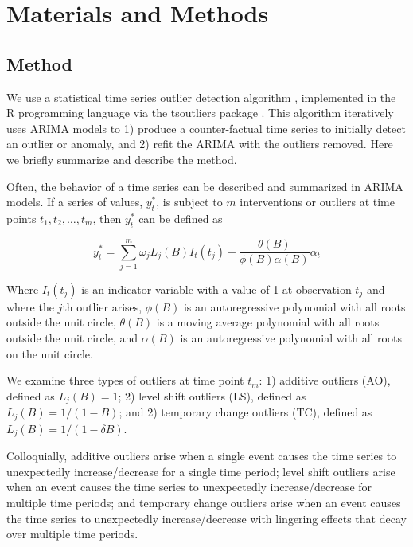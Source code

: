 \documentclass[12pt]{article}
\begin{document}
\hypertarget{materials-and-methods}{%
\section{Materials and Methods}\label{materials-and-methods}}

\hypertarget{method}{%
\subsection{Method}\label{method}}

We use a statistical time series outlier detection algorithm
\citep{chen1993joint}, implemented in the R programming language
\citep{rcore} via the tsoutliers package \citep{tsoutliers2019}. This
algorithm iteratively uses ARIMA models to 1) produce a counter-factual
time series to initially detect an outlier or anomaly, and 2) refit the
ARIMA with the outliers removed. Here we briefly summarize and describe
the method.

Often, the behavior of a time series can be described and summarized in
ARIMA models. If a series of values, \(y_t^*\), is subject to \(m\)
interventions or outliers at time points \(t_1,t_2,…,t_m\), then
\(y_t^*\) can be defined as

\[y_t^* = \sum_{j=1}^{m} \omega_jL_j(B)I_t(t_j) + \frac{\theta(B)}{\phi(B)\alpha(B)}\alpha_t\]

Where \(I_t(t_j)\) is an indicator variable with a value of 1 at
observation \(t_j\) and where the \(j\)th outlier arises, \(\phi(B)\) is
an autoregressive polynomial with all roots outside the unit circle,
\(\theta(B)\) is a moving average polynomial with all roots outside the
unit circle, and \(\alpha(B)\) is an autoregressive polynomial with all
roots on the unit circle.

We examine three types of outliers at time point \(t_m\): 1) additive
outliers (AO), defined as \(L_j(B)=1\); 2) level shift outliers (LS),
defined as \(L_j(B) = 1/(1-B)\); and 2) temporary change outliers (TC),
defined as \(L_j(B) = 1/(1-\delta B)\).

Colloquially, additive outliers arise when a single event causes the
time series to unexpectedly increase/decrease for a single time period;
level shift outliers arise when an event causes the time series to
unexpectedly increase/decrease for multiple time periods; and temporary
change outliers arise when an event causes the time series to
unexpectedly increase/decrease with lingering effects that decay over
multiple time periods.
\end{document}
